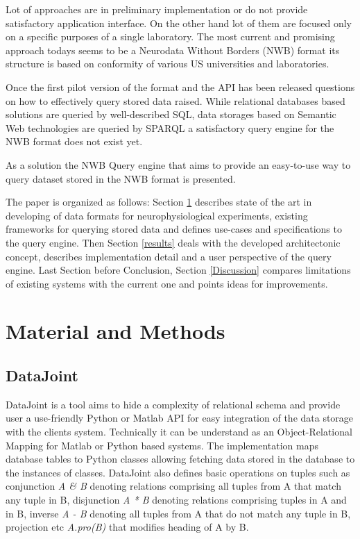 \documentclass[utf8]{frontiersSCNS} %
\begin{document}
Lot of approaches are in preliminary implementation or do not provide satisfactory application interface. On the other hand lot of them are focused only on a specific purposes of a single laboratory. The most current and promising approach todays seems to be a Neurodata Without Borders (NWB) format its structure is based on conformity of various US universities and laboratories.

Once the first pilot version of the format and the API has been released \citep{teeters-neuron} questions on how to effectively query stored data raised. While relational databases based solutions are queried by well-described SQL, data storages based on Semantic Web technologies are queried by SPARQL \citep{prudhommeaux2008sparql} a satisfactory query engine for the NWB format does not exist yet.

As a solution the NWB Query engine that aims to provide an easy-to-use way to query dataset stored in the NWB format is presented.

The paper is organized as follows: Section \ref{materials_and_methods} describes state of the art in developing of data formats for neurophysiological experiments, existing frameworks for querying stored data and defines use-cases and specifications to the query engine. Then Section \ref{results} deals with the developed architectonic concept, describes implementation detail and a user perspective of the query engine. Last Section before Conclusion, Section \ref{Discussion} compares limitations of existing systems with the current one and points ideas for improvements.


\section{Material and Methods}
\label{materials_and_methods}

\subsection{DataJoint}

DataJoint \citep{Yatsenko031658} is a tool aims to hide a complexity of relational schema and provide user a use-friendly Python or Matlab API for easy integration of the data storage with the clients system. Technically it can be understand as an Object-Relational Mapping \citep{Keith2010} for Matlab or Python based systems. The implementation maps database tables to Python classes allowing fetching data stored in the database to the instances of classes. DataJoint also defines basic operations on tuples such as conjunction \emph{A \& B} denoting relations comprising all tuples from A that match any tuple in B, disjunction \emph{A * B} denoting relations comprising tuples in A and in B, inverse \emph{A - B} denoting all tuples from A that do not match any tuple in B, projection etc \emph{A.pro(B)} that modifies heading of A by B.
\end{document}
